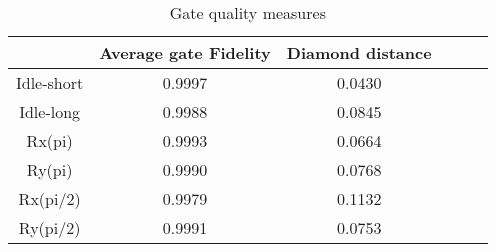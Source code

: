 \begin{table}[h!]
\centering
\caption{Gate quality measures}
\begin{tabular}{c|c|c|c|c|c}
\toprule
 & Average gate Fidelity & Diamond distance \\
\midrule
Idle-short & 0.9997 & 0.0430 \\
Idle-long & 0.9988 & 0.0845 \\
Rx(pi) & 0.9993 & 0.0664 \\
Ry(pi) & 0.9990 & 0.0768 \\
Rx(pi/2) & 0.9979 & 0.1132 \\
Ry(pi/2) & 0.9991 & 0.0753 \\
\bottomrule
\end{tabular}
\end{table}
